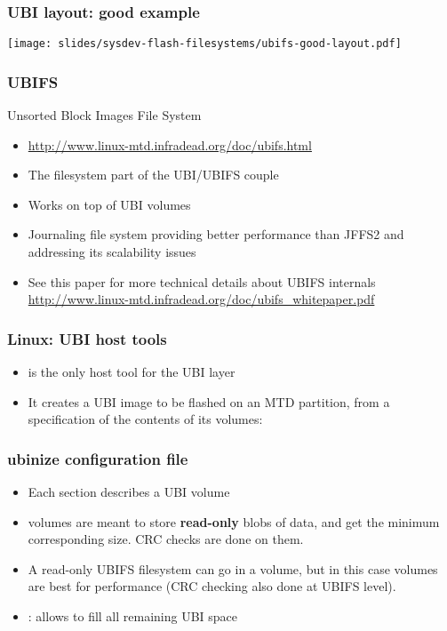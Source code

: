\begin{frame}
  \frametitle{UBI layout: good example}
  \begin{center}
    \texttt{[image: slides/sysdev-flash-filesystems/ubifs-good-layout.pdf]}
  \end{center}
\end{frame}

\begin{frame}
  \frametitle{UBIFS}
  Unsorted Block Images File System
  \begin{itemize}
  \item \url{http://www.linux-mtd.infradead.org/doc/ubifs.html}
  \item The filesystem part of the UBI/UBIFS couple
  \item Works on top of UBI volumes
  \item Journaling file system providing better performance than
    JFFS2 and addressing its scalability issues
  \item See this paper for more technical details about UBIFS internals
    \url{http://www.linux-mtd.infradead.org/doc/ubifs_whitepaper.pdf}
  \end{itemize}
\end{frame}

\begin{frame}[fragile]
  \frametitle{Linux: UBI host tools}
  \begin{itemize}
  \item {} is the only host tool for the UBI layer
  \item It creates a UBI image to be flashed on an MTD partition,
	from a specification of the contents of its volumes:
  \end{itemize}
  
\end{frame}

\begin{frame}[fragile]
  \frametitle{ubinize configuration file}
  \begin{itemize}
  \item Each section describes a UBI volume
  \item {} volumes are meant to store {\bf read-only} blobs of data,
	and get the minimum corresponding size. CRC checks are done on
        them.
  \item A read-only UBIFS filesystem can go in a 
	volume, but in this case  volumes are best
        for performance (CRC checking also done at UBIFS level).
  \item {}: allows to fill all remaining UBI space
  \end{itemize}
  
\end{frame}

